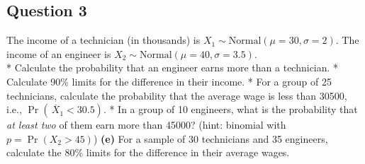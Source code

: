 
\subsection*{Question 3}
The income of a technician (in thousands) is $X_1 \sim \text{Normal}(\mu=30,\sigma=2)$. The income of an engineer is $X_2 \sim \text{Normal}(\mu=40,\sigma=3.5)$. \\[-0.2cm]

*  Calculate the probability that an engineer earns more than a technician. 
 *  Calculate 90\% limits for the difference in their income. 
 *  For a group of 25 technicians, calculate the probability that the average wage is less than 30500, i.e., $\Pr(\,\overline{\!X}_1 < 30.5)$. 
 *  In a group of 10 engineers, what is the probability that \emph{at least two} of them earn more than 45000? (hint: binomial with $p = \Pr(X_2 > 45)$) 
 {\bf(e)} For a sample of 30 technicians and 35 engineers, calculate the 80\% limits for the difference in their average wages.


